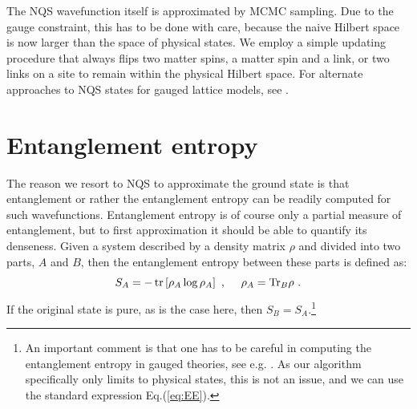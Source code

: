 	The NQS wavefunction itself is approximated by MCMC sampling. Due to the gauge constraint, this has to be done with care, because the naive Hilbert space is now larger than the space of physical states. We employ a simple updating procedure that always flips two matter spins, a matter spin and a link, or two links on a site to remain within the physical Hilbert space. For alternate approaches to NQS states for gauged lattice models, see \cite{luoGaugeEquivariantNeural2021}. 
	
	\section{Entanglement entropy}
	\label{sec:ee}
	
	The reason we resort to NQS to approximate the ground state is that entanglement or rather the entanglement entropy can be readily computed for such wavefunctions. Entanglement entropy is of course only a partial measure of entanglement, but to first approximation it should be able to quantify its denseness. Given a system described by a density matrix $\rho$ and divided into two parts, $A$ and $B$, then the entanglement entropy between these parts is defined as:
	\begin{equation}
		\label{eq:EE}
		S_A = -\tr \left[\rho_A \log \rho_A\right] ~,~~~~\rho_A =\text{Tr}_B\rho~.
	\end{equation}
	If the original state is pure, as is the case here, then $S_B=S_A$.\footnote{
		An important comment is that one has to be careful in computing the entanglement entropy in gauged theories, see e.g. \cite{Trivedi}. As our algorithm specifically only limits to physical states, this is not an issue, and we can use the standard expression Eq.(\eqref{eq:EE}).}
	
